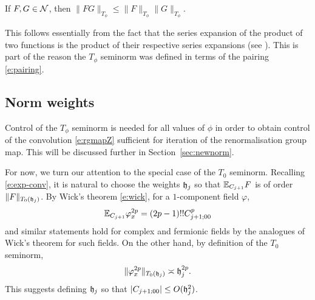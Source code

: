 \begin{prop}
\label{prop:prod}
If $F, G \in \mathcal{N}$, then $\|F G\|_{T_\phi} \le \|F\|_{T_\phi} \|G\|_{T_\phi}$.
\end{prop}

\begin{rk}
This follows essentially from the fact that
the series expansion of the product of two functions is the product of their
respective series expansions (see \cite{BS-rg-norm}). This is part of the reason
the $T_\phi$ seminorm was defined in terms of the pairing \eqref{e:pairing}.
\end{rk}


\subsection{Norm weights}
\label{sec:weights}

Control of the $T_\phi$ seminorm is needed for all values of
$\phi$ in order to obtain control of the convolution \eqref{e:rgmapZ} sufficient
for iteration of the renormalisation group map.
This will be discussed further in Section~\ref{sec:newnorm}.

For now, we turn our attention to the special case of the $T_0$ seminorm. Recalling
\eqref{e:exp-conv}, it is natural to choose the weights $\mathfrak{h}_j$ so that
$\mathbb{E}_{C_{j+1}} F$ is of order $\|F\|_{T_0(\mathfrak{h}_j)}$.
By Wick's theorem \eqref{e:wick}, for a $1$-component field $\varphi$,
\begin{equation}
\mathbb{E}_{C_{j+1}} \varphi_x^{2p} = (2p - 1)!! C_{j+1;00}^p
\end{equation}
and similar statements hold for complex and fermionic fields by the analogues of
Wick's theorem for such fields.
On the other hand, by definition of the $T_0$ seminorm,
\begin{equation}
\label{e:gauss-moments}
\|\varphi_x^{2p}\|_{T_0(\mathfrak{h}_j)} \asymp \mathfrak{h}_j^{2p}.
\end{equation}
This suggests defining $\mathfrak{h}_j$ so that $|C_{j+1;00}| \le O(\mathfrak{h}^2_j)$.

